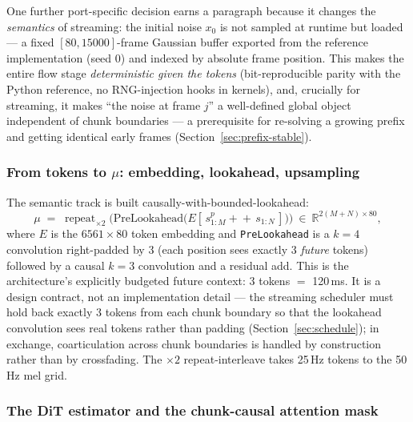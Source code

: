 \documentclass[11pt,a4paper]{article}
\newcommand{\R}{\mathbb{R}}
\newcommand{\code}[1]{\texttt{#1}}
\begin{document}
One further port-specific decision earns a paragraph because it changes the
\emph{semantics} of streaming: the initial noise $x_0$ is not sampled at runtime but
loaded --- a fixed $[80, 15000]$-frame Gaussian buffer exported from the reference
implementation (seed 0) and indexed by absolute frame position. This makes the entire
flow stage \emph{deterministic given the tokens} (bit-reproducible parity with the
Python reference, no RNG-injection hooks in kernels), and, crucially for streaming, it
makes ``the noise at frame $j$'' a well-defined global object independent of chunk
boundaries --- a prerequisite for re-solving a growing prefix and getting identical
early frames (Section~\ref{sec:prefix-stable}).

\subsubsection{From tokens to $\mu$: embedding, lookahead, upsampling}

The semantic track is built causally-with-bounded-lookahead:
\begin{equation}
\mu \;=\; \operatorname{repeat}_{\times 2}\!\Big(
\mathrm{PreLookahead}\big( E[\,s^{p}_{1:M} +\!\!+\, s_{1:N}\,] \big) \Big)
\ \in\ \R^{2(M+N) \times 80},
\label{eq:mu}
\end{equation}
where $E$ is the $6561\times80$ token embedding and \code{PreLookahead} is a $k{=}4$
convolution right-padded by 3 (each position sees exactly 3 \emph{future} tokens)
followed by a causal $k{=}3$ convolution and a residual add. This is the architecture's
explicitly budgeted future context: 3 tokens $=$ 120\,ms. It is a design contract, not
an implementation detail --- the streaming scheduler must hold back exactly 3 tokens
from each chunk boundary so that the lookahead convolution sees real tokens rather than
padding (Section~\ref{sec:schedule}); in exchange, coarticulation across chunk
boundaries is handled by construction rather than by crossfading. The $\times 2$
repeat-interleave takes 25\,Hz tokens to the 50\,Hz mel grid.

\subsubsection{The DiT estimator and the chunk-causal attention mask}
\label{sec:dit}
\end{document}
